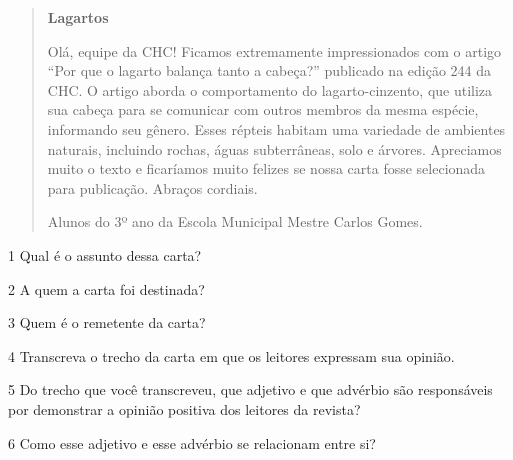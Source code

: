 \begin{quote}
\textbf{Lagartos}

Olá, equipe da CHC! Ficamos extremamente impressionados com o artigo ``Por que o lagarto balança tanto a cabeça?'' publicado na edição 244 da CHC. O artigo aborda o comportamento do lagarto-cinzento, que utiliza sua cabeça para se comunicar com outros membros da mesma espécie, informando seu gênero. Esses répteis habitam uma variedade de ambientes naturais, incluindo rochas, águas subterrâneas, solo e árvores. Apreciamos muito o texto e ficaríamos muito felizes se nossa carta fosse selecionada para publicação. Abraços cordiais.

Alunos do 3º ano da Escola Municipal Mestre Carlos Gomes.

\end{quote}

\num{1} Qual é o assunto dessa carta?


\num{2} A quem a carta foi destinada?


\num{3} Quem é o remetente da carta?


\num{4} Transcreva o trecho da carta em que os leitores expressam sua opinião.


\num{5} Do trecho que você transcreveu, que adjetivo e que advérbio são responsáveis por demonstrar a opinião positiva dos leitores da revista?


\num{6} Como esse adjetivo e esse advérbio se relacionam entre si?


